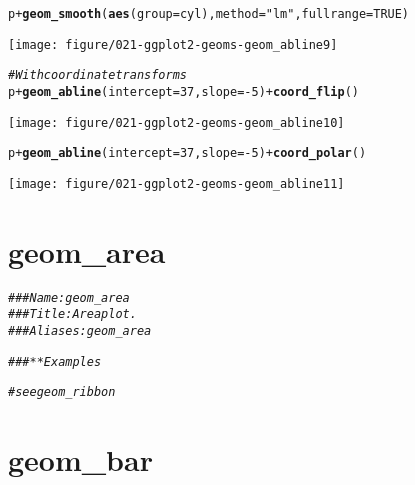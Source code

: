 \documentclass[a4paper,titlepage]{tufte-handout}\usepackage[]{graphicx}\usepackage[]{color}
\makeatletter
\def\maxwidth{ %
  \ifdim\Gin@nat@width>\linewidth
    \linewidth
  \else
    \Gin@nat@width
  \fi
}
\newcommand{\hlnum}[1]{\textcolor[rgb]{0.686,0.059,0.569}{#1}}%
\newcommand{\hlstr}[1]{\textcolor[rgb]{0.192,0.494,0.8}{#1}}%
\newcommand{\hlcom}[1]{\textcolor[rgb]{0.678,0.584,0.686}{\textit{#1}}}%
\newcommand{\hlopt}[1]{\textcolor[rgb]{0,0,0}{#1}}%
\newcommand{\hlstd}[1]{\textcolor[rgb]{0.345,0.345,0.345}{#1}}%
\newcommand{\hlkwc}[1]{\textcolor[rgb]{0.333,0.667,0.333}{#1}}%
\newcommand{\hlkwd}[1]{\textcolor[rgb]{0.737,0.353,0.396}{\textbf{#1}}}%
\newenvironment{kframe}{%
 \def\at@end@of@kframe{}%
 \ifinner\ifhmode%
  \def\at@end@of@kframe{\end{minipage}}%
  \begin{minipage}{\columnwidth}%
 \fi\fi%
 \def\FrameCommand##1{\hskip\@totalleftmargin \hskip-\fboxsep
 \colorbox{shadecolor}{##1}\hskip-\fboxsep
     \hskip-\linewidth \hskip-\@totalleftmargin \hskip\columnwidth}%
 \MakeFramed {\advance\hsize-\width
   \@totalleftmargin\z@ \linewidth\hsize
   \@setminipage}}%
 {\par\unskip\endMakeFramed%
 \at@end@of@kframe}
\newenvironment{knitrout}{}{} %
\makeatother
\begin{document}
\begin{knitrout}
\begin{kframe}
\begin{alltt}
\hlstd{p} \hlopt{+} \hlkwd{geom_smooth}\hlstd{(}\hlkwd{aes}\hlstd{(}\hlkwc{group}\hlstd{=cyl),} \hlkwc{method}\hlstd{=}\hlstr{"lm"}\hlstd{,} \hlkwc{fullrange}\hlstd{=}\hlnum{TRUE}\hlstd{)}
\end{alltt}
\end{kframe}
\texttt{[image: figure/021-ggplot2-geoms-geom\_abline9]} 
\begin{kframe}\begin{alltt}
\hlcom{# With coordinate transforms}
\hlstd{p} \hlopt{+} \hlkwd{geom_abline}\hlstd{(}\hlkwc{intercept} \hlstd{=} \hlnum{37}\hlstd{,} \hlkwc{slope} \hlstd{=} \hlopt{-}\hlnum{5}\hlstd{)} \hlopt{+} \hlkwd{coord_flip}\hlstd{()}
\end{alltt}
\end{kframe}
\texttt{[image: figure/021-ggplot2-geoms-geom\_abline10]} 
\begin{kframe}\begin{alltt}
\hlstd{p} \hlopt{+} \hlkwd{geom_abline}\hlstd{(}\hlkwc{intercept} \hlstd{=} \hlnum{37}\hlstd{,} \hlkwc{slope} \hlstd{=} \hlopt{-}\hlnum{5}\hlstd{)} \hlopt{+} \hlkwd{coord_polar}\hlstd{()}
\end{alltt}
\end{kframe}
\texttt{[image: figure/021-ggplot2-geoms-geom\_abline11]} 

\end{knitrout}


\section{geom\_area}

\begin{knitrout}
\color{fgcolor}\begin{kframe}
\begin{alltt}
\hlcom{### Name: geom_area}
\hlcom{### Title: Area plot.}
\hlcom{### Aliases: geom_area}

\hlcom{### ** Examples}

\hlcom{# see geom_ribbon}
\end{alltt}
\end{kframe}
\end{knitrout}


\section{geom\_bar}
\end{document}
